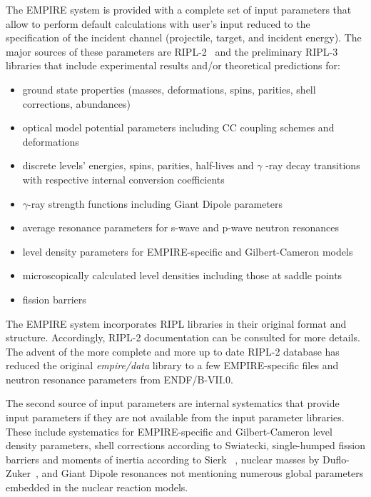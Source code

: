 The EMPIRE system is provided with a complete set of input parameters that
allow to perform default calculations with user's input reduced to the
specification of the incident channel (projectile, target, and incident
energy). The major sources of these parameters are RIPL-2~\cite{RIPL2} and
the preliminary RIPL-3 libraries that include experimental results and/or
theoretical predictions for:

\begin{itemize}
\item ground state properties (masses, deformations, spins, parities, shell
corrections, abundances)

\item optical model potential parameters including CC coupling schemes and
deformations

\item discrete levels' energies, spins, parities, half-lives and $\gamma$%
-ray decay transitions with respective internal conversion coefficients

\item $\gamma$-ray strength functions including Giant Dipole parameters

\item average resonance parameters for s-wave and p-wave neutron resonances

\item level density parameters for EMPIRE-specific and Gilbert-Cameron models

\item microscopically calculated level densities including those at saddle
points

\item fission barriers
\end{itemize}

The EMPIRE system incorporates RIPL libraries in their original format and
structure. Accordingly, RIPL-2 documentation can be consulted for more
details. The advent of the more complete and more up to date RIPL-2 database
has reduced the original \emph{empire/data} library to a few EMPIRE-specific
files and neutron resonance parameters from ENDF/B-VII.0.

The second source of input parameters are internal systematics that provide
input parameters if they are not available from the input parameter
libraries. These include systematics for EMPIRE-specific and Gilbert-Cameron
level density parameters, shell corrections according to Swiatecki,
single-humped fission barriers and moments of inertia according to Sierk~%
\cite{sierk}, nuclear masses by Duflo-Zuker~\cite{Duflo:96}, and Giant
Dipole resonances not mentioning numerous global parameters embedded in the
nuclear reaction models.

